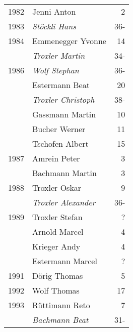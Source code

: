 {\begin{longtable}{ l l r }
        1982          & Jenni Anton                               & 2           \\
        1983          & \emph{Stöckli Hans}                       & 36-         \\
        1984          & Emmenegger Yvonne                         & 14          \\
                      & \emph{Troxler Martin}                     & 34-         \\
        1986          & \emph{Wolf Stephan}                       & 36-         \\
                      & Estermann Beat                            & 20          \\
                      & \emph{Troxler Christoph}                  & 38-         \\
                      & Gassmann Martin                           & 10          \\
                      & Bucher Werner                             & 11          \\
                      & Tschofen Albert                           & 15          \\
        1987          & Amrein Peter                              & 3           \\
                      & Bachmann Martin                           & 3           \\
        1988          & Troxler Oskar                             & 9           \\
                      & \emph{Troxler Alexander}                  & 36-         \\
        1989          & Troxler Stefan                            & ?           \\
                      & Arnold Marcel                             & 4           \\
                      & Krieger Andy                              & 4           \\
                      & Estermann Marcel                          & ?           \\
        1991          & Dörig Thomas                              & 5           \\
        1992          & Wolf Thomas                               & 17          \\
        1993          & Rüttimann Reto                            & 7           \\
                      & \emph{Bachmann Beat}                      & 31-         \\

\end{longtable}}
